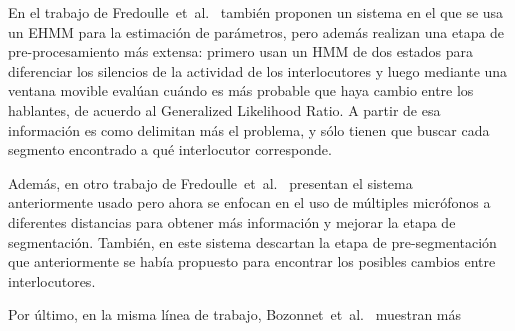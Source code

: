 En el trabajo de Fredoulle~et~al.~\cite{Fredouille2007} también proponen un sistema en el que se usa un \ac{EHMM} para la estimación de parámetros, pero además realizan una etapa de pre-procesamiento más extensa: primero usan un \ac{HMM} de dos estados para diferenciar los silencios de la actividad de los interlocutores y luego mediante una ventana movible evalúan cuándo es más probable que haya cambio entre los hablantes, de acuerdo al Generalized Likelihood Ratio. A partir de esa información es como delimitan más el problema, y sólo tienen que buscar cada segmento encontrado a qué interlocutor corresponde.

Además, en otro trabajo de Fredoulle~et~al.~\cite{Fredouille2009} presentan el sistema \td~ anteriormente usado pero ahora se enfocan en el uso de múltiples micrófonos a diferentes distancias para obtener más información y mejorar la etapa de segmentación. También, en este sistema descartan la etapa de pre-segmentación que anteriormente se había propuesto para encontrar los posibles cambios entre interlocutores. 

Por último, en la misma línea de trabajo, Bozonnet~et~al.~\cite{Bozonnet2010} muestran más 

